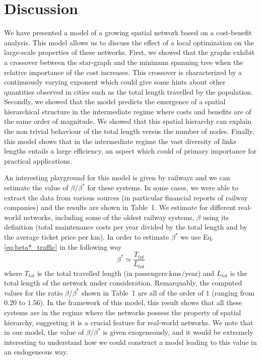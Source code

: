 \section{Discussion}

We have presented a model of a growing spatial network based on a cost-benefit analysis. This model allows us to discuss the effect of a local optimization on the large-scale properties of these networks. First, we showed that the graphs exhibit a crossover between the star-graph and the minimum spanning tree when the relative importance of the cost increases. This crossover is characterized by a continuously varying exponent which could give some hints about other quantities observed in cities such as the total length travelled by the population. Secondly, we showed that the model predicts the emergence of a spatial hierarchical structure in the intermediate regime where costs and benefits are of the same order of magnitude. We showed that this spatial hierarchy can explain the non trivial behaviour of the total length versus the number of nodes. Finally, this model shows that in the intermediate regime the vast diversity of links lengths entails a large efficiency, an aspect which could of primary importance for practical applications.

An interesting playground for this model is given by railways and we can estimate the value of $\beta/\beta^*$ for these systems. In some cases, we were able to extract the data from various sources (in particular financial reports of railway companies) and the results are shown in Table~1. We estimate for different real-world networks, including some of the oldest railway systems, $\beta$ using its definition (total maintenance costs per year divided by the total length and by the average ticket price per km). In order to estimate $\beta^*$ we use Eq.\ref{eq:beta*_traffic} in the following way
\begin{equation}
\beta^*\simeq\frac{T_{tot}}{L_{tot}}
\end{equation}
where $T_{tot}$ is the total travelled length (in passengers$\cdot$kms$/$year) and $L_{tot}$ is the total length of the network under consideration. Remarquably, the computed values for the ratio $\beta/\beta^*$ shown in Table~1 are all of the order of $1$ (ranging from $0.20$ to $1.56$). In the framework of this model, this result shows that all these systems are in the regime where the networks possess the property of spatial hierarchy, suggesting it is a crucial feature for real-world networks. We note that in our model, the value of $\beta / \beta^*$ is given exogeneously, and it would be extremely interesting to understand how we could construct a model leading to this value in an endogeneous way.

